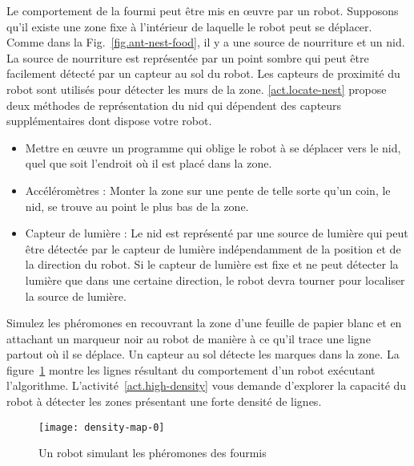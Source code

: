 Le comportement de la fourmi peut être mis en œuvre par un robot.\label{s.ant-like-algo} Supposons qu'il existe une zone fixe à l'intérieur de laquelle le robot peut se déplacer. Comme dans la Fig.~\ref{fig.ant-nest-food}, il y a une source de nourriture et un nid. La source de nourriture est représentée par un point sombre qui peut être facilement détecté par un capteur au sol du robot. Les capteurs de proximité du robot sont utilisés pour détecter les murs de la zone. \ref{act.locate-nest} propose deux méthodes de représentation du nid qui dépendent des capteurs supplémentaires dont dispose votre robot.

\begin{framed}
\begin{itemize}
\item Mettre en œuvre un programme qui oblige le robot à se déplacer vers le nid, quel que soit l'endroit où il est placé dans la zone.
\item Accéléromètres : Monter la zone sur une pente de telle sorte qu'un coin, le nid, se trouve au point le plus bas de la zone. 
\item Capteur de lumière : Le nid est représenté par une source de lumière qui peut être détectée par le capteur de lumière indépendamment de la position et de la direction du robot. Si le capteur de lumière est fixe et ne peut détecter la lumière que dans une certaine direction, le robot devra tourner pour localiser la source de lumière.
\end{itemize}
\end{framed}

Simulez les phéromones en recouvrant la zone d'une feuille de papier blanc et en attachant un marqueur noir au robot de manière à ce qu'il trace une ligne partout où il se déplace. Un capteur au sol détecte les marques dans la zone. La figure~\ref{fig.ant-result} montre les lignes résultant du comportement d'un robot exécutant l'algorithme. L'activité~\ref{act.high-density} vous demande d'explorer la capacité du robot à détecter les zones présentant une forte densité de lignes.

\begin{figure}
\begin{center}
\texttt{[image: density-map-0]}
\end{center}
\caption{Un robot simulant les phéromones des fourmis}\label{fig.ant-result}
\end{figure}

